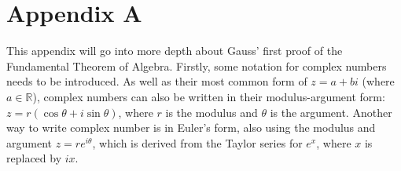 \documentclass{article}
\begin{document}
\newpage
\appendix
\section*{Appendix A}
This appendix will go into more depth about Gauss' first proof of the Fundamental Theorem of Algebra. Firstly, some notation for complex numbers needs to be introduced. As well as their most common form of \(z = a+bi\) (where \(a \in \mathbb{R}\)), complex numbers can also be written in their modulus-argument form: \(z = r(\cos{\theta} + i\sin{\theta})\), where \(r\) is the modulus and \(\theta\) is the argument. Another way to write complex number is in Euler's form, also using the modulus and argument \(z = re^{i\theta}\), which is derived from the Taylor series for \(e^x\), where \(x\) is replaced by \(ix\).
\end{document}
